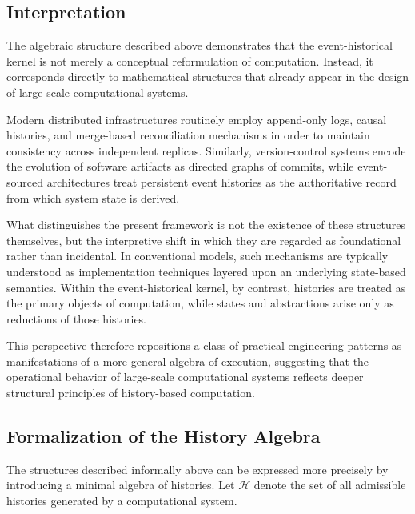 \documentclass[12pt]{article}
\begin{document}
\subsection{Interpretation}

The algebraic structure described above demonstrates
that the event-historical kernel is not merely a
conceptual reformulation of computation. Instead, it
corresponds directly to mathematical structures that
already appear in the design of large-scale computational
systems.

Modern distributed infrastructures routinely employ
append-only logs, causal histories, and merge-based
reconciliation mechanisms in order to maintain
consistency across independent replicas. Similarly,
version-control systems encode the evolution of
software artifacts as directed graphs of commits,
while event-sourced architectures treat persistent
event histories as the authoritative record from
which system state is derived.

What distinguishes the present framework is not the
existence of these structures themselves, but the
interpretive shift in which they are regarded as
foundational rather than incidental. In conventional
models, such mechanisms are typically understood as
implementation techniques layered upon an underlying
state-based semantics. Within the event-historical
kernel, by contrast, histories are treated as the
primary objects of computation, while states and
abstractions arise only as reductions of those
histories.

This perspective therefore repositions a class of
practical engineering patterns as manifestations of
a more general algebra of execution, suggesting that
the operational behavior of large-scale computational
systems reflects deeper structural principles of
history-based computation.


\subsection{Formalization of the History Algebra}

The structures described informally above can be expressed
more precisely by introducing a minimal algebra of histories.
Let $\mathcal{H}$ denote the set of all admissible histories
generated by a computational system.
\end{document}
